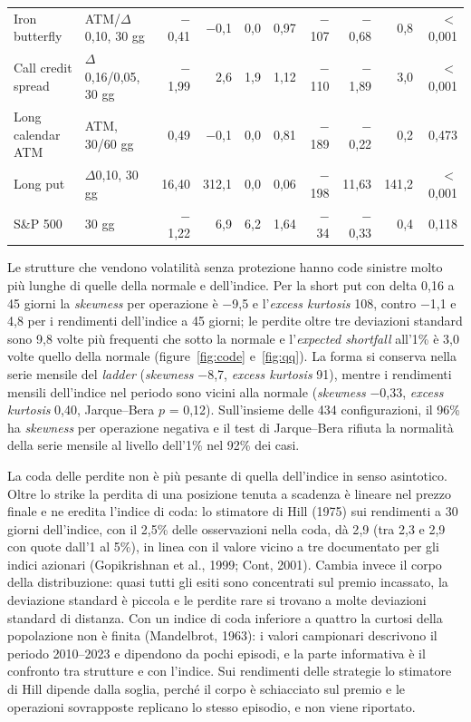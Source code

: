 \documentclass[11pt,a4paper]{article}
\begin{document}
\begin{table}[ht]
{\begin{tabular}{llrrrrrrrr}
Iron butterfly & ATM/$\Delta$0{,}10, 30 gg & $-$0{,}41 & $-$0{,}1 & 0{,}0 & 0{,}97 & $-$107 & $-$0{,}68 & 0{,}8 & $<$0{,}001 \\
Call credit spread & $\Delta$0{,}16/0{,}05, 30 gg & $-$1{,}99 & 2{,}6 & 1{,}9 & 1{,}12 & $-$110 & $-$1{,}89 & 3{,}0 & $<$0{,}001 \\
Long calendar ATM & ATM, 30/60 gg & 0{,}49 & $-$0{,}1 & 0{,}0 & 0{,}81 & $-$189 & $-$0{,}22 & 0{,}2 & 0{,}473 \\
Long put & $\Delta$0{,}10, 30 gg & 16{,}40 & 312{,}1 & 0{,}0 & 0{,}06 & $-$198 & 11{,}63 & 141{,}2 & $<$0{,}001 \\
\midrule
S\&P 500 & 30 gg & $-$1{,}22 & 6{,}9 & 6{,}2 & 1{,}64 & $-$34 & $-$0{,}33 & 0{,}4 & 0{,}118 \\
\bottomrule\end{tabular}}\end{table}

Le strutture che vendono volatilità senza protezione hanno code sinistre molto più lunghe di quelle della normale e dell'indice. Per la short put con delta 0{,}16 a 45 giorni la \emph{skewness} per operazione è $-$9{,}5 e l'\emph{excess kurtosis} 108, contro $-$1{,}1 e 4{,}8 per i rendimenti dell'indice a 45 giorni; le perdite oltre tre deviazioni standard sono 9{,}8 volte più frequenti che sotto la normale e l'\emph{expected shortfall} all'1\% è 3{,}0 volte quello della normale (figure~\ref{fig:code} e~\ref{fig:qq}). La forma si conserva nella serie mensile del \emph{ladder} (\emph{skewness} $-$8{,}7, \emph{excess kurtosis} 91), mentre i rendimenti mensili dell'indice nel periodo sono vicini alla normale (\emph{skewness} $-$0{,}33, \emph{excess kurtosis} 0{,}40, Jarque--Bera $p$ = 0{,}12). Sull'insieme delle 434 configurazioni, il 96\% ha \emph{skewness} per operazione negativa e il test di Jarque--Bera rifiuta la normalità della serie mensile al livello dell'1\% nel 92\% dei casi.

La coda delle perdite non è più pesante di quella dell'indice in senso asintotico. Oltre lo strike la perdita di una posizione tenuta a scadenza è lineare nel prezzo finale e ne eredita l'indice di coda: lo stimatore di Hill (1975) sui rendimenti a 30 giorni dell'indice, con il 2{,}5\% delle osservazioni nella coda, dà 2{,}9 (tra 2{,}3 e 2{,}9 con quote dall'1 al 5\%), in linea con il valore vicino a tre documentato per gli indici azionari (Gopikrishnan et al., 1999; Cont, 2001). Cambia invece il corpo della distribuzione: quasi tutti gli esiti sono concentrati sul premio incassato, la deviazione standard è piccola e le perdite rare si trovano a molte deviazioni standard di distanza. Con un indice di coda inferiore a quattro la curtosi della popolazione non è finita (Mandelbrot, 1963): i valori campionari descrivono il periodo 2010--2023 e dipendono da pochi episodi, e la parte informativa è il confronto tra strutture e con l'indice. Sui rendimenti delle strategie lo stimatore di Hill dipende dalla soglia, perché il corpo è schiacciato sul premio e le operazioni sovrapposte replicano lo stesso episodio, e non viene riportato.
\end{document}
